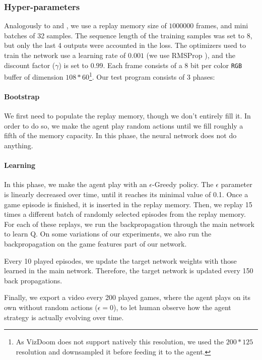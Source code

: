 \documentclass[letterpaper]{article}
\begin{document}
\subsubsection{Hyper-parameters}
Analogously to \cite{Mnih2015} and \cite{Lample2016}, we use a replay memory
size of $1000000$ frames, and mini batches of 32 samples. The sequence length of
the training samples was set to 8, but only the last 4 outputs were accounted
in the loss. The optimizers used to train the network use a learning rate of
$0.001$ (we use RMSProp \citep{rmsprop}), and the discount factor ($\gamma$) is set to $0.99$.
Each frame consists of a 8 bit per color \texttt{RGB} buffer of dimension
$108 * 60$\footnote{As VizDoom does not support natively this resolution, we
used the $200 * 125$ resolution and downsampled it before feeding it to the
agent.}. Our test program consists of 3 phases:

\paragraph{Bootstrap}
We first need to populate the replay memory, though we don't entirely fill it.
In order to do so, we make the agent play random actions until we fill roughly a
fifth of the memory capacity. In this phase, the neural network does not do
anything.

\paragraph{Learning}
In this phase, we make the agent play with an $\epsilon$-Greedy policy. The
$\epsilon$ parameter is linearly decreased over time, until it reaches its
minimal value of 0.1.
Once a game episode is finished, it is inserted in the replay memory. Then, we replay
15 times a different batch of randomly selected episodes from the replay memory.
For each of these replays, we run the backpropagation through the main network to
learn Q. On some variations of our experiments, we also run the backpropagation
on the game features part of our network.

Every 10 played episodes, we update the target network weights with those learned
in the main network. Therefore, the target network is updated every 150 back
propagations.

Finally, we export a video every 200 played games, where the agent plays on its
own without random actions ($\epsilon = 0$), to let human observe how the
agent strategy is actually evolving over time.
\end{document}

